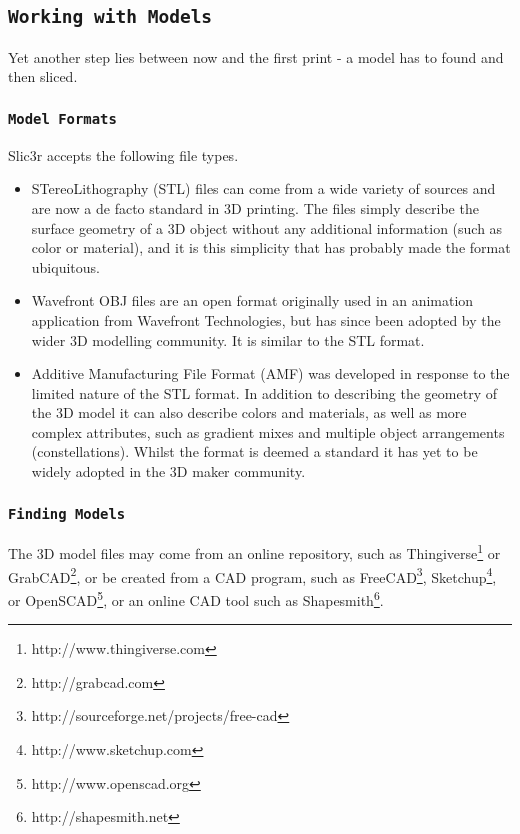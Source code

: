 \subsection{\texttt{Working with Models}}
\label{sub:working_with_models}

Yet another step lies between now and the first print - a model has to found and then sliced.

\subsubsection{\texttt{Model Formats}} %
\label{sub:model_formats}

Slic3r accepts the following file types.

\begin{itemize}
	\item STereoLithography (STL) files can come from a wide variety of sources and are now a de facto standard in 3D printing.  The files simply describe the surface geometry of a 3D object without any additional information (such as color or material), and it is this simplicity that has probably made the format ubiquitous.
	\item Wavefront OBJ files are an open format originally used in an animation application from Wavefront Technologies, but has since been adopted by the wider 3D modelling community.  It is similar to the STL format.
	\item Additive Manufacturing File Format (AMF) was developed in response to the limited nature of the STL format.  In addition to describing the geometry of the 3D model it can also describe colors and materials, as well as more complex attributes, such as gradient mixes and multiple object arrangements (constellations).  Whilst the format is deemed a standard it has yet to be widely adopted in the 3D maker community.
\end{itemize}

\subsubsection{\texttt{Finding Models}} %
\label{sub:finding_models}

The 3D model files may come from an online repository, such as Thingiverse\footnote{http://www.thingiverse.com} or GrabCAD\footnote{http://grabcad.com}, or be created from a CAD program, such as FreeCAD\footnote{http://sourceforge.net/projects/free-cad}, Sketchup\footnote{http://www.sketchup.com}, or OpenSCAD\footnote{http://www.openscad.org}, or an online CAD tool such as Shapesmith\footnote{http://shapesmith.net}.

